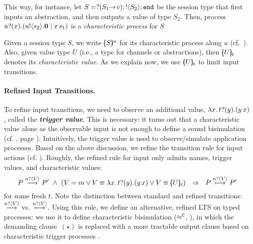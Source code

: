 This way, for instance, let $S = ? (S_1\!\! \rightarrow\! \diamond) ; ! \langle S_2 \rangle ; \mathtt{end}$
be the session type that first
inputs an abstraction, %
and then outputs a value of type $S_2$.
Then, process $u ? (x) . (u ! \langle s_2 \rangle . \mathbf{0} \;|\; x\, {s_1})$
is a \emph{characteristic process} for $S$ 


Given a session type $S$, we write $[\!\!(S)\!\!]^{u} $
for its characteristic process along   $u$
(cf.~).
Also, %
given value type $U$ (i.e., a type for channels or abstractions), then
$[\!\!(U)\!\!]_{\mathsf{c}}$ denotes its \emph{characteristic value}.
As we explain now, we use 
$[\!\!(U)\!\!]_{\mathsf{c}}$
 to limit input transitions.

\paragraph{Refined Input Transitions.}
To refine  input transitions, we need to observe 
an additional value, 
$\lambda {x}.\,t ? (y) . (y\, {{x}})$, 
called the {\bf\em trigger value}. 
This is necessary: it turns out
that a characteristic value 
alone as the observable input 
is not enough to define a sound bisimulation (cf. , page \pageref{ex:motivation}).
Intuitively, the trigger value is used
to observe/simulate application processes.
Based on the above discussion, we refine 
the transition rule for input actions (cf. ). 
Roughly, the 
refined rule for   input only  admits names, trigger values, and characteristic values:
$$
{
~~P \stackrel{n ? \langle V \rangle}{\longrightarrow} P' ~\land~ (V = m \vee V \equiv \lambda {x}.\,t ? (y) . (y\, {{x}}) \vee  V \equiv [\!\!(U)\!\!]_{\mathsf{c}})
  ~~\Rightarrow~~
P \stackrel{n ? \langle V \rangle}{\longmapsto} P'~~
}
$$
for some fresh $t$.
Note the distinction between standard and refined transitions: $\stackrel{n ? \langle V \rangle}{\longrightarrow}$ vs. $\stackrel{n ? \langle V \rangle}{\longmapsto}$.
Using this rule, we define an alternative, refined  LTS on typed processes: 
we use it to define
characteristic  bisimulation 
($\approx^\mathtt{C}$, ),
in which the demanding clause~$(\star)$ is replaced with 
a more tractable output clause based on 
characteristic 
trigger processes
.


